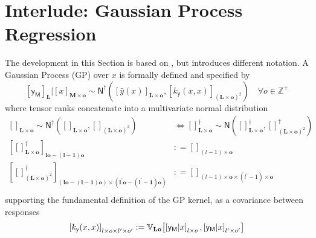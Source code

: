 \documentclass[preprint,12pt]{elsarticle}
\newcommand*{\M}[1]{\ensuremath{#1}\xspace}
\newcommand*{\x}{\times}
\newcommand*{\mi}[1]{\mathbf{#1}}
\newcommand*{\st}[1]{\mathbb{#1}}
\newcommand*{\rv}[1]{\mathsf{#1}}
\newcommand*{\te}[2][]{\left\lbrack{#2}\right\rbrack_{#1}}
\newcommand*{\deq}{\M{\mathrel{\mathop:}=}}
\newcommand*{\cov}[3][]{\ifthenelse{\equal{#1}{}}{\mathbb{V}_{#3}\!\left\lbrack{#2}\right\rbrack}{\mathbb{V}_{#3}\!\left\lbrack{#2,#1}\right\rbrack}}
\newcommand*{\gauss}[2]{\mathsf{N}\!\left({#1,#2}\right)}
\newcommand*{\gaussd}[2]{\mathsf{N}^{\dagger}\!\left({#1,#2}\right)}
\begin{document}
\section{Interlude: Gaussian Process Regression} \label{sec:GPR}
    The development in this Section is based on \cite{Alvarez.etal2011}, but introduces different notation. A Gaussian Process (GP) over $x$ is formally defined and specified by
    \begin{equation*}
        \te[\mi{L}]{\rv{y_M}} \big\vert \te[\mi{M}\x\mi{o}]{x} \sim 
        \gaussd{\te[\mi{L}\x\mi{o}]{\bar{y}(x)}}{\te[(\mi{L}\x\mi{o})^{2}]
        {k_{\rv{y}}(x,x)}} \quad \forall o \in \st{Z^{+}}
    \end{equation*}
    where tensor ranks concatenate into a multivariate normal distribution
    \begin{equation*}
        \begin{aligned}
            \te[\mi{L}\x\mi{o}]{} \sim \gaussd{\te[\mi{L}\x\mi{o}]{}}{\te[(\mi{L\x o})^{2}]{}}
            & \Longleftrightarrow
            \te[\mi{L}\x\mi{o}]{}^{\dagger} \sim \gauss{\te[\mi{L}\x\mi{o}]{}^{\dagger}}{\te[(\mi{L\x o})^{2}]{}^{\dagger}} \\
            \te[\mi{lo}-\mi{(l-1)o}]{\te[\mi{L}\x\mi{o}]{}^{\dagger}} 
            &\deq \te[(l-1)\x\mi{o}]{} \\
            \te[(\mi{lo}-(\mi{l-1})\mi{o}) \x (\mi{l^{\prime}o}-\mi{(l^{\prime}-1)o})]
            {\te[(\mi{L\x o})^{2}]{}^{\dagger}} 
            &\deq \te[(l-1)\x\mi{o} \x (l^{\prime}-1)\x\mi{o}]{} \\
        \end{aligned}
    \end{equation*}
    supporting the fundamental definition of the GP kernel, as a covariance between responses
    \begin{equation*}
        \te[l\x o\x l^{\prime}\x o^{\prime}]{k_{\rv{y}}(x,x)} 
        \deq \cov[{\te[l^{\prime}\x o^{\prime}]{\rv{y_M}\vert x}}]{\te[l\x o]{\rv{y_M}\vert x}}{\mi{Lo}}
    \end{equation*}
\end{document}
